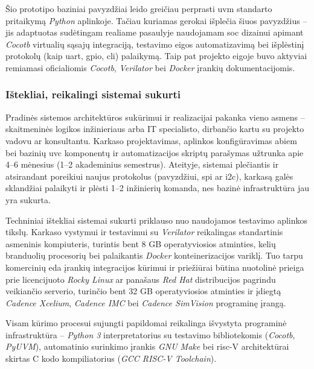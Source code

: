 Šio prototipo baziniai pavyzdžiai leido greičiau perprasti \gls{uvm} standarto pritaikymą \textit{Python} aplinkoje. Tačiau kuriamas  gerokai išplečia šiuos pavyzdžius -- jis adaptuotas sudėtingam realiame pasaulyje naudojamam \gls{soc} dizainui apimant \textit{Cocotb} virtualių sąsajų integraciją,  testavimo eigos automatizavimą bei išplėstinį protokolų (kaip \gls{uart}, \gls{gpio}, \gls{cli}) palaikymą. Taip pat projekto eigoje buvo aktyviai remiamasi oficialiomis \textit{Cocotb}, \textit{Verilator} bei \textit{Docker} įrankių dokumentacijomis.

\subsubsection{Ištekliai, reikalingi sistemai sukurti}\label{section:istekliai-reikalingi-sistemai-sukurti}

Pradinės sistemos architektūros sukūrimui ir realizacijai pakanka vieno asmens -- skaitmeninės logikos  inžinieriaus arba IT specialisto, dirbančio kartu su projekto vadovu ar konsultantu. Karkaso projektavimas,  aplinkos konfigūravimas abiem  bei bazinių \gls{uvc} komponentų ir automatizacijos skriptų parašymas užtrunka apie 4--6 mėnesius (1--2 akademinius semestrus). Ateityje, sistemai plečiantis ir atsirandant poreikiui  naujus  protokolus (pavyzdžiui, \gls{spi} ar \gls{i2c}), karkasą galės sklandžiai palaikyti ir plėsti 1--2 inžinierių komanda, nes bazinė infrastruktūra jau yra sukurta.

Techniniai ištekliai sistemai sukurti priklauso nuo naudojamos testavimo aplinkos tikslų. Karkaso vystymui ir testavimui su  \textit{Verilator}  reikalingas standartinis asmeninis kompiuteris, turintis bent 8 GB operatyviosios atminties, kelių branduolių procesorių bei palaikantis \textit{Docker} konteinerizacijos variklį. Tuo tarpu komercinių \gls{eda} įrankių integracijos kūrimui ir priežiūrai būtina nuotolinė prieiga prie licencijuoto \textit{Rocky Linux} ar panašaus \textit{Red Hat} distribucijos pagrindu veikiančio serverio, turinčio bent 32 GB operatyviosios atminties ir įdiegtą \textit{Cadence Xcelium}, \textit{Cadence IMC} bei \textit{Cadence SimVision} programinę įrangą. 

Visam kūrimo procesui sujungti papildomai reikalinga išvystyta programinė infrastruktūra -- \textit{Python 3} interpretatorius su testavimo bibliotekomis (\textit{Cocotb}, \textit{PyUVM}), automatinio surinkimo įrankis \textit{GNU Make} bei \gls{risc}-V architektūrai skirtas C kodo kompiliatorius (\textit{GCC RISC-V Toolchain}).

